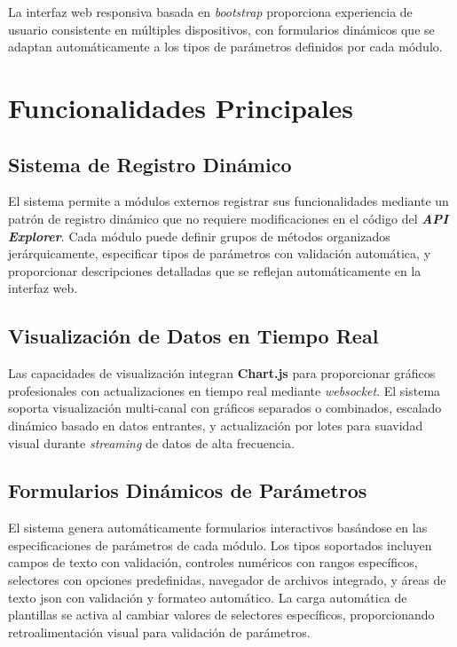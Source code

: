La interfaz web responsiva basada en \textit{\gls{bootstrap}} proporciona experiencia de usuario consistente en múltiples dispositivos, con formularios dinámicos que se adaptan automáticamente a los tipos de parámetros definidos por cada módulo.

\section{Funcionalidades Principales}
\label{sec:funcionalidades_api_explorer}

\subsection{Sistema de Registro Dinámico}
\label{subsec:registro_dinamico}

El sistema permite a módulos externos registrar sus funcionalidades mediante un patrón de registro dinámico que no requiere modificaciones en el código del \textit{\textbf{API Explorer}}. Cada módulo puede definir grupos de métodos organizados jerárquicamente, especificar tipos de parámetros con validación automática, y proporcionar descripciones detalladas que se reflejan automáticamente en la interfaz web.

\subsection{Visualización de Datos en Tiempo Real}
\label{subsec:visualizacion_tiempo_real}

Las capacidades de visualización integran \textbf{Chart.js} para proporcionar gráficos profesionales con actualizaciones en tiempo real mediante \textit{\gls{websocket}}. El sistema soporta visualización multi-canal con gráficos separados o combinados, escalado dinámico basado en datos entrantes, y actualización por lotes para suavidad visual durante \textit{\gls{streaming}} de datos de alta frecuencia.

\subsection{Formularios Dinámicos de Parámetros}
\label{subsec:formularios_dinamicos}

El sistema genera automáticamente formularios interactivos basándose en las especificaciones de parámetros de cada módulo. Los tipos soportados incluyen campos de texto con validación, controles numéricos con rangos específicos, selectores con opciones predefinidas, navegador de archivos integrado, y áreas de texto \acrshort{json} con validación y formateo automático. La carga automática de plantillas se activa al cambiar valores de selectores específicos, proporcionando retroalimentación visual para validación de parámetros.

